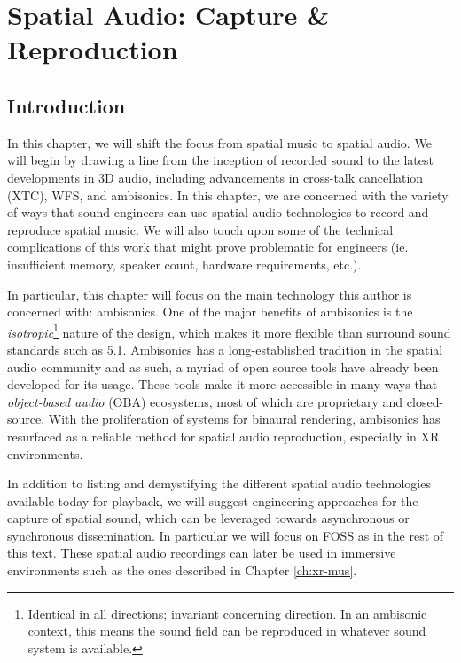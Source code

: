 \chapter{Spatial Audio: Capture \& Reproduction} \label{ch:spat-aud}

\section{Introduction}

In this chapter, we will shift the focus from spatial music to spatial audio. We will begin by drawing a line from the inception of recorded sound to the latest developments in 3D audio, including advancements in cross-talk cancellation (XTC), WFS, and ambisonics. In this chapter, we are concerned with the variety of ways that sound engineers can use spatial audio technologies to record and reproduce spatial music. We will also touch upon some of the technical complications of this work that might prove problematic for engineers (ie. insufficient memory, speaker count, hardware requirements, etc.).

In particular, this chapter will focus on the main technology this author is concerned with: ambisonics. One of the major benefits of ambisonics is the \textit{isotropic}\footnote{Identical in all directions; invariant concerning direction. In an ambisonic context, this means the sound field can be reproduced in whatever sound system is available.} nature of the design, which makes it more flexible than surround sound standards such as 5.1. Ambisonics has a long-established tradition in the spatial audio community and as such, a myriad of open source tools have already been developed for its usage. These tools make it more accessible in many ways that \textit{object-based audio} (OBA) ecosystems, most of which are proprietary and closed-source. With the proliferation of systems for binaural rendering, ambisonics has resurfaced as a reliable method for spatial audio reproduction, especially in XR environments.

In addition to listing and demystifying the different spatial audio technologies available today for playback, we will suggest engineering approaches for the capture of spatial sound, which can be leveraged towards asynchronous or synchronous dissemination. In particular we will focus on FOSS as in the rest of this text. These spatial audio recordings can later be used in immersive environments such as the ones described in Chapter \ref{ch:xr-mus}. 


